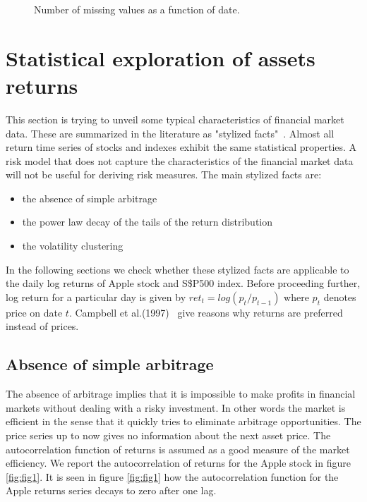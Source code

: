 \documentclass[letterpaper,12pt]{article}
\begin{document}
\begin{figure}
  \centering
  \caption{Number of missing values as a function of date.\label{fig:fig0}}
\end{figure}

\section{Statistical exploration of assets returns}

This section is trying to unveil some typical characteristics of financial market data. These are summarized in the literature as "stylized facts"~\cite{Rama}. Almost all return time series of stocks and indexes exhibit the same statistical properties. A risk model that does not capture the characteristics of the financial market data will not be useful for deriving risk measures. The main stylized facts are: 
\begin{itemize}
\item the absence of simple arbitrage
\item the power law decay of the tails of the return distribution
\item the volatility clustering
\end{itemize}
In the following sections we check whether these stylized facts are applicable to the daily log returns of Apple stock and S\$P500 index. Before proceeding further, log return for a particular day is given by $ret_t = log(p_t/p_{t-1})$ where $p_t$ denotes price on date $t$. Campbell et al.(1997)~\cite{Campbell} give reasons why returns are preferred instead of prices.

\subsection{Absence of simple arbitrage}

The absence of arbitrage implies that it is impossible to make profits in financial markets without dealing with a risky investment. In other words the market is efficient in the sense that it quickly tries to eliminate arbitrage opportunities. The price series up to now gives no information about the next asset price. The autocorrelation function of returns is assumed as a good measure of the market efficiency. We report the autocorrelation of returns for the Apple stock in figure \ref{fig:fig1}. It is seen in figure \ref{fig:fig1} how the autocorrelation function for the Apple returns series decays to zero after one lag. 
\end{document}
